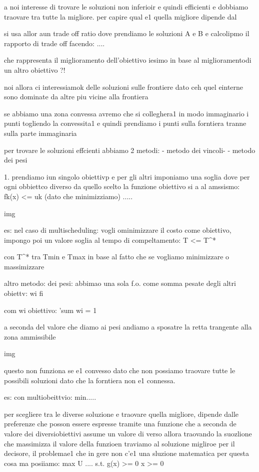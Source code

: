 a noi interesse di trovare le soluzioni non inferioir e quindi efficienti e dobbiamo traovare tra tutte la migliore. per capire qual e1 quella migliore dipende dal 


si usa allor aun trade off ratio dove prendiamo le soluzioni A e B e calcolipmo il rapporto di trade off facendo:
....

che rappresenta il miglioramento dell'obiettivo iesimo in base al miglioramentodi un altro obiettivo ?!

noi allora ci interessiamok delle soluzioni sulle frontiere dato ceh quel einterne sono dominate da altre piu vicine alla frontiera

se abbiamo una zona convessa avremo che si colleghera1 in modo immaginario i punti togliendo la convessita1 e quindi prendiamo i punti sulla forntiera tranne sulla parte immaginaria


per trovare le soluzioni effcienti abbiamo 2 metodi:
- metodo dei vincoli-
- metodo dei pesi


1. prendiamo iun singolo obiettivp e per gli altri imponiamo una soglia dove per ogni obbiettco diverso da quello scelto la funzione obiettivo si a al amssismo:
fk(x) <= uk (dato che minimizziamo)
.....

img


es: nel caso di multischeduling:
vogli ominimizzare il costo come obiettivo, impongo poi un valore soglia al tempo di compeltamento:
T <= T^*

con T^* tra Tmin e Tmax in base al fatto che se vogliamo minimizzare o massimizzare



altro metodo: dei pesi:
abbimao una sola f.o. come somma pesate degli altri obiettv:
\sum wi fi

com wi obiettivo: 'sum wi = 1

a seconda del valore che diamo ai pesi andiamo a sposatre la retta trangente alla zona ammissibile

img

questo non funziona se e1 convesso dato che non possiamo traovare tutte le possibili soluzioni dato che la forntiera non e1 connessa. 

es: con multiobeittvio:
min.....





per scegliere tra le diverse soluzione e traovare quella migliore, dipende dalle preferenze che posson essere espresse tramite una funzione che a seconda de valore dei diversiobiettivi assume un valore di verso allora traovando la suozlione che massimizza il valore della funzioen traviamo al soluzione migliroe per il decisore, il problemae1 che in gere non c'e1 una sluzione matematica per questa cosa ma  posiiamo:
max U ....
s.t.
g(x) >= 0
x >= 0

